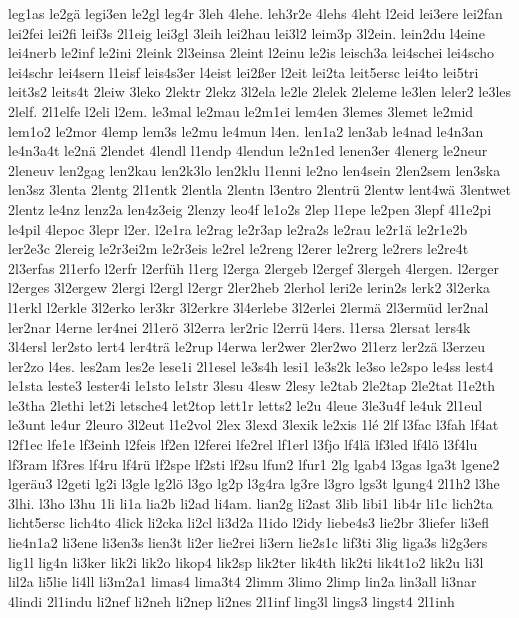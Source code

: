{leg1as
le2gä
legi3en
le2gl
leg4r
3leh
4lehe.
leh3r2e
4lehs
4leht
l2eid
lei3ere
lei2fan
lei2fei
lei2fi
leif3s
2l1eig
lei3gl
3leih
lei2hau
lei3l2
leim3p
3l2ein.
lein2du
l4eine
lei4nerb
le2inf
le2ini
2leink
2l3einsa
2leint
l2einu
le2is
leisch3a
lei4schei
lei4scho
lei4schr
lei4sern
l1eisf
leis4s3er
l4eist
lei2ßer
l2eit
lei2ta
leit5ersc
lei4to
lei5tri
leit3s2
leits4t
2leiw
3leko
2lektr
2lekz
3l2ela
le2le
2lelek
2leleme
le3len
leler2
le3les
2lelf.
2l1elfe
l2eli
l2em.
le3mal
le2mau
le2m1ei
lem4en
3lemes
3lemet
le2mid
lem1o2
le2mor
4lemp
lem3s
le2mu
le4mun
l4en.
len1a2
len3ab
le4nad
le4n3an
le4n3a4t
le2nä
2lendet
4lendl
l1endp
4lendun
le2n1ed
lenen3er
4lenerg
le2neur
2leneuv
len2gag
len2kau
len2k3lo
len2klu
l1enni
le2no
len4sein
2len2sem
len3ska
len3sz
3lenta
2lentg
2l1entk
2lentla
2lentn
l3entro
2lentrü
2lentw
lent4wä
3lentwet
2lentz
le4nz
lenz2a
len4z3eig
2lenzy
leo4f
le1o2s
2lep
l1epe
le2pen
3lepf
4l1e2pi
le4pil
4lepoc
3lepr
l2er.
l2e1ra
le2rag
le2r3ap
le2ra2s
le2rau
le2r1ä
le2r1e2b
ler2e3c
2lereig
le2r3ei2m
le2r3eis
le2rel
le2reng
l2erer
le2rerg
le2rers
le2re4t
2l3erfas
2l1erfo
l2erfr
l2erfüh
l1erg
l2erga
2lergeb
l2ergef
3lergeh
4lergen.
l2erger
l2erges
3l2ergew
2lergi
l2ergl
l2ergr
2ler2heb
2lerhol
leri2e
lerin2s
lerk2
3l2erka
l1erkl
l2erkle
3l2erko
ler3kr
3l2erkre
3l4erlebe
3l2erlei
2lermä
2l3ermüd
ler2nal
ler2nar
l4erne
ler4nei
2l1erö
3l2erra
ler2ric
l2errü
l4ers.
l1ersa
2lersat
lers4k
3l4ersl
ler2sto
lert4
ler4trä
le2rup
l4erwa
ler2wer
2ler2wo
2l1erz
ler2zä
l3erzeu
ler2zo
l4es.
les2am
les2e
lese1i
2l1esel
le3s4h
lesi1
le3s2k
le3so
le2spo
le4ss
lest4
le1sta
leste3
lester4i
le1sto
le1str
3lesu
4lesw
2lesy
le2tab
2le2tap
2le2tat
l1e2th
le3tha
2lethi
let2i
letsche4
let2top
lett1r
letts2
le2u
4leue
3le3u4f
le4uk
2l1eul
le3unt
le4ur
2leuro
3l2eut
l1e2vol
2lex
3lexd
3lexik
le2xis
1lé
2lf
l3fac
l3fah
lf4at
l2f1ec
lfe1e
lf3einh
l2feis
lf2en
l2ferei
lfe2rel
lf1erl
l3fjo
lf4lä
lf3led
lf4lö
l3f4lu
lf3ram
lf3res
lf4ru
lf4rü
lf2spe
lf2sti
lf2su
lfun2
lfur1
2lg
lgab4
l3gas
lga3t
lgene2
lgeräu3
l2geti
lg2i
l3gle
lg2lö
l3go
lg2p
l3g4ra
lg3re
l3gro
lgs3t
lgung4
2l1h2
l3he
3lhi.
l3ho
l3hu
1li
li1a
lia2b
li2ad
li4am.
lian2g
li2ast
3lib
libi1
lib4r
li1c
lich2ta
licht5ersc
lich4to
4lick
li2cka
li2cl
li3d2a
l1ido
l2idy
liebe4s3
lie2br
3liefer
li3efl
lie4n1a2
li3ene
li3en3s
lien3t
li2er
lie2rei
li3ern
lie2s1c
lif3ti
3lig
liga3s
li2g3ers
lig1l
lig4n
li3ker
lik2i
lik2o
likop4
lik2sp
lik2ter
lik4th
lik2ti
lik4t1o2
lik2u
li3l
lil2a
li5lie
li4ll
li3m2a1
limas4
lima3t4
2limm
3limo
2limp
lin2a
lin3all
li3nar
4lindi
2l1indu
li2nef
li2neh
li2nep
li2nes
2l1inf
ling3l
lings3
lingst4
2l1inh
}

